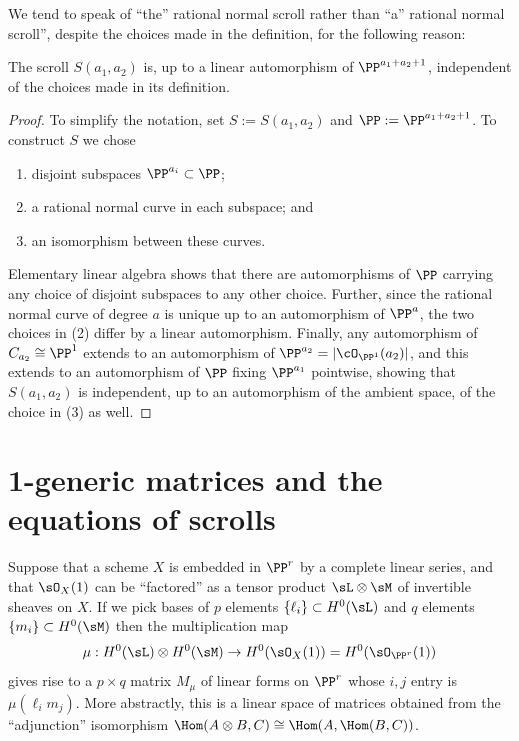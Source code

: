 We tend to speak of ``the'' rational normal scroll rather than ``a'' rational normal scroll'', despite the choices made in the definition, for the following reason:

\begin{proposition}\label{uniqueness of scrolls}
The scroll $S(a_1,a_2)$ is, up to a linear automorphism of $\PP^{a_1+a_2+1}$, independent of the choices made in its
 definition. 
\end{proposition}

\begin{proof} 
To simplify the notation, set $S := S(a_{1}, a_{2})$ and $\PP := \PP^{a_1+a_2+1}$.
To construct $S$ we chose 
\begin{enumerate}
 \item disjoint subspaces $\PP^{a_i}\subset \PP$;
 \item a rational normal curve in each subspace; and
 \item an isomorphism between these curves.
\end{enumerate}
Elementary linear algebra shows that there are automorphisms of $\PP$ carrying any choice of disjoint subspaces to any other choice. Further, since the rational normal curve of degree $a$ is unique up to an automorphism of $\PP^{a}$, the two choices in (2) differ by a linear automorphism. Finally, any automorphism of $C_{a_{2}}\cong \PP^{1}$ extends to an automorphism of $\PP^{a_{2}} = |\cO_{\PP^{1}}(a_{2})|$, and this extends to an automorphism of $\PP$ fixing $\PP^{a_{1}}$ pointwise,
showing that $S(a_{1}, a_{2})$ is independent, up to an automorphism of the ambient space, of the choice in (3)  as well.
\end{proof}



\section{1-generic matrices and the equations of scrolls}\label{particular name}

Suppose that a scheme $X $ is embedded in $\PP^r$ by a complete linear series, and that
$\sO_X(1)$ can be ``factored'' as a tensor product $\sL\otimes \sM$ of invertible sheaves on $X$. If we pick bases of $p$  elements $\{\ell_i\}\subset H^0(\sL)$ and  $q$  elements $\{m_i\} \subset H^0(\sM)$ then the multiplication map 
$$
\mu: H^0(\sL) \otimes H^0(\sM) \to H^0(\sO_{X}(1))= H^0(\sO_{\PP^r}(1))
$$
 gives rise to 
a $p\times q$ matrix $M_\mu$ of linear forms on $\PP^r$ whose $i,j$ entry is $\mu(\ell_im_j)$.
More abstractly, this is a linear space of matrices obtained from the ``adjunction'' isomorphism 
$\Hom(A\otimes B, C)\cong \Hom(A, \Hom(B,C))$.

